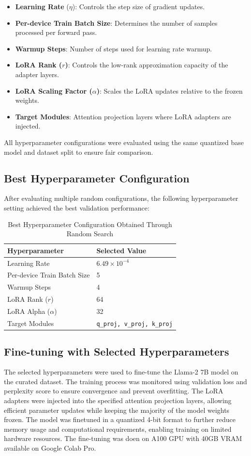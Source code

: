 \begin{itemize}
    \item \textbf{Learning Rate} ($\eta$): Controls the step size of gradient updates.
    \item \textbf{Per-device Train Batch Size}: Determines the number of samples processed per forward pass.
    \item \textbf{Warmup Steps}: Number of steps used for learning rate warmup.
    \item \textbf{LoRA Rank ($r$)}: Controls the low-rank approximation capacity of the adapter layers.
    \item \textbf{LoRA Scaling Factor ($\alpha$)}: Scales the LoRA updates relative to the frozen weights.
    \item \textbf{Target Modules}: Attention projection layers where LoRA adapters are injected.
\end{itemize}

All hyperparameter configurations were evaluated using the same quantized base model and dataset split to ensure fair comparison.

\subsection{Best Hyperparameter Configuration}

After evaluating multiple random configurations, the following hyperparameter setting achieved the best validation performance:

\begin{table}[h]
\centering
\begin{tabular}{ll}
\hline
\textbf{Hyperparameter} & \textbf{Selected Value} \\
\hline
Learning Rate & $6.49 \times 10^{-4}$ \\
Per-device Train Batch Size & 5 \\
Warmup Steps & 4 \\
LoRA Rank ($r$) & 64 \\
LoRA Alpha ($\alpha$) & 32 \\
Target Modules & \texttt{q\_proj, v\_proj, k\_proj} \\
\hline
\end{tabular}
\caption{Best Hyperparameter Configuration Obtained Through Random Search}
\end{table}

\subsection{Fine-tuning with Selected Hyperparameters}
The selected hyperparameters were used to fine-tune the Llama-2 7B model on the curated dataset. The training process was monitored using validation loss and perplexity score to ensure convergence and prevent overfitting. The LoRA adapters were injected into the specified attention projection layers, allowing efficient parameter updates while keeping the majority of the model weights frozen. The model was finetuned in a quantized 4-bit format to further reduce memory usage and computational requirements, enabling training on limited hardware resources. The fine-tuning was doen on A100 GPU with 40GB VRAM available on Google Colab Pro.

